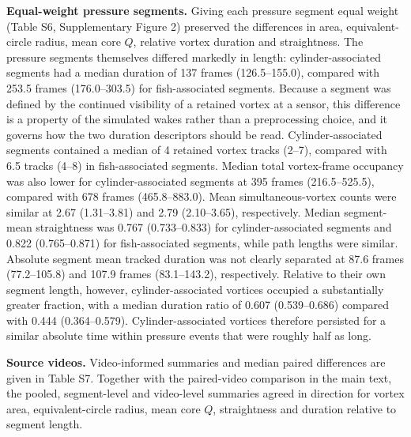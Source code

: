 \documentclass[11pt,a4paper]{article}
\begin{document}
\textbf{Equal-weight pressure segments.} Giving each pressure segment equal weight (Table S6, Supplementary Figure 2) preserved the differences in area, equivalent-circle radius, mean core $Q$, relative vortex duration and straightness. The pressure segments themselves differed markedly in length: cylinder-associated segments had a median duration of 137 frames (126.5--155.0), compared with 253.5 frames (176.0--303.5) for fish-associated segments. Because a segment was defined by the continued visibility of a retained vortex at a sensor, this difference is a property of the simulated wakes rather than a preprocessing choice, and it governs how the two duration descriptors should be read. Cylinder-associated segments contained a median of 4 retained vortex tracks (2--7), compared with 6.5 tracks (4--8) in fish-associated segments. Median total vortex-frame occupancy was also lower for cylinder-associated segments at 395 frames (216.5--525.5), compared with 678 frames (465.8--883.0). Mean simultaneous-vortex counts were similar at 2.67 (1.31--3.81) and 2.79 (2.10--3.65), respectively. Median segment-mean straightness was 0.767 (0.733--0.833) for cylinder-associated segments and 0.822 (0.765--0.871) for fish-associated segments, while path lengths were similar. Absolute segment mean tracked duration was not clearly separated at 87.6 frames (77.2--105.8) and 107.9 frames (83.1--143.2), respectively. Relative to their own segment length, however, cylinder-associated vortices occupied a substantially greater fraction, with a median duration ratio of 0.607 (0.539--0.686) compared with 0.444 (0.364--0.579). Cylinder-associated vortices therefore persisted for a similar absolute time within pressure events that were roughly half as long.

\textbf{Source videos.} Video-informed summaries and median paired differences are given in Table S7. Together with the paired-video comparison in the main text, the pooled, segment-level and video-level summaries agreed in direction for vortex area, equivalent-circle radius, mean core $Q$, straightness and duration relative to segment length.
\end{document}
